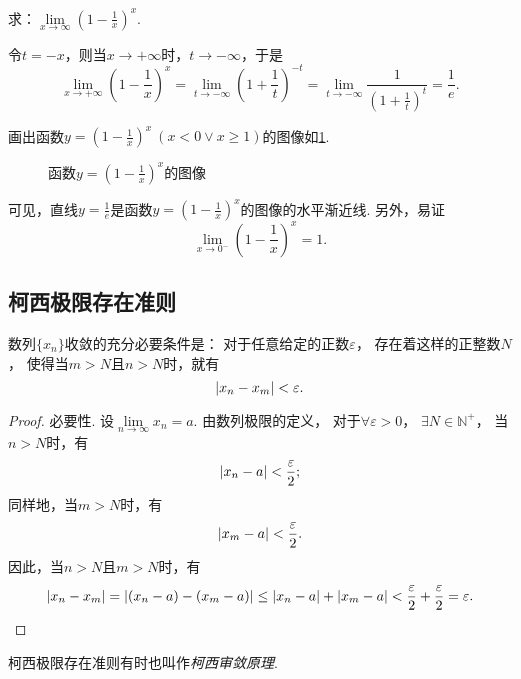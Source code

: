 \begin{example}
求：\(\lim\limits_{x \to \infty}\left(1 - \frac{1}{x}\right)^x\).
\begin{solution}
令\(t = -x\)，则当\(x \to +\infty\)时，\(t \to -\infty\)，于是\[
\lim\limits_{x \to +\infty}\left(1 - \frac{1}{x}\right)^x
= \lim\limits_{t \to -\infty}\left(1 + \frac{1}{t}\right)^{-t}
= \lim\limits_{t \to -\infty}\frac{1}{\left(1 + \frac{1}{t}\right)^t}
= \frac{1}{e}.
\]
\end{solution}

画出函数\(y=\left(1-\frac{1}{x}\right)^x\ (x<0 \lor x\geq1)\)的图像如\cref{figure:极限.函数(1-1/x)^x的图像}.
\begin{figure}[ht]
\centering
{}
\caption{函数\(y=\left(1-\tfrac{1}{x}\right)^x\)的图像}
\label{figure:极限.函数(1-1/x)^x的图像}
\end{figure}
可见，直线\(y=\frac{1}{e}\)是函数\(y=\left(1-\frac{1}{x}\right)^x\)的图像的水平渐近线.
另外，易证\[
\lim\limits_{x\to0^-} \left(1-\frac{1}{x}\right)^x = 1.
\]
\end{example}

\subsection{柯西极限存在准则}
\begin{theorem}[柯西极限存在准则]\label{theorem:极限.数列的柯西极限存在准则}
数列\(\{x_n\}\)收敛的充分必要条件是：
对于任意给定的正数\(\varepsilon\)，
存在着这样的正整数\(N\)，
使得当\(m>N\)且\(n>N\)时，就有\[
	\abs{x_n-x_m}<\varepsilon.
\]
\begin{proof}
必要性.
设\(\lim\limits_{n\to\infty}x_n = a\).
由数列极限的定义，
对于\(\forall\varepsilon>0\)，
\(\exists N \in \mathbb{N}^+\)，
当\(n > N\)时，有\[
	\abs{x_n - a} < \frac{\varepsilon}{2};
\]
同样地，当\(m > N\)时，有\[
	\abs{x_m - a} < \frac{\varepsilon}{2}.
\]
因此，当\(n > N\)且\(m > N\)时，有\[
	\abs{x_n - x_m} = \abs{(x_n - a) - (x_m - a)}
	\leq \abs{x_n - a} + \abs{x_m - a}
	< \frac{\varepsilon}{2} + \frac{\varepsilon}{2}
	= \varepsilon.
	\qedhere
\]
\end{proof}
\end{theorem}
柯西极限存在准则有时也叫作\emph{柯西审敛原理}.

